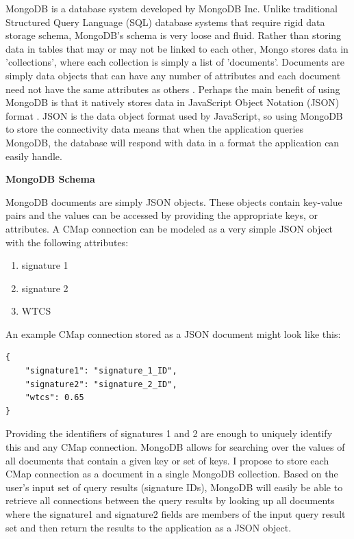 \documentclass[12pt]{article}
\begin{document}
MongoDB is a database system developed by MongoDB Inc. Unlike traditional Structured Query Language (SQL) database systems that require rigid data storage schema, MongoDB's schema is very loose and fluid. Rather than storing data in tables that may or may not be linked to each other, Mongo stores data in 'collections', where each collection is simply a list of 'documents'. Documents are simply data objects that can have any number of attributes and each document need not have the same attributes as others \cite{mongodb}. Perhaps the main benefit of using MongoDB is that it natively stores data in JavaScript Object Notation (JSON) format \cite{json}. JSON is the data object format used by JavaScript, so using MongoDB to store the connectivity data means that when the application queries MongoDB, the database will respond with data in a format the application can easily handle.

\textbf{MongoDB Schema}

MongoDB documents are simply JSON objects. These objects contain key-value pairs and the values can be accessed by providing the appropriate keys, or attributes. A CMap connection can be modeled as a very simple JSON object with the following attributes:

\begin{enumerate}
\item signature 1
\item signature 2
\item WTCS
\end{enumerate}

An example CMap connection stored as a JSON document might look like this:

\begin{lstlisting}
{
	"signature1": "signature_1_ID",
	"signature2": "signature_2_ID",
	"wtcs": 0.65
}
\end{lstlisting}
	
Providing the identifiers of signatures 1 and 2 are enough to uniquely identify this and any CMap connection. MongoDB allows for searching over the values of all documents that contain a given key or set of keys. I propose to store each CMap connection as a document in a single MongoDB collection. Based on the user's input set of query results (signature IDs), MongoDB will easily be able to retrieve all connections between the query results by looking up all documents where the signature1 and signature2 fields are members of the input query result set and then return the results to the application as a JSON object.
\end{document}
